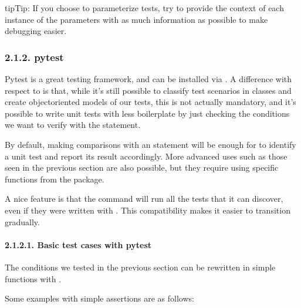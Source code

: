 \documentclass[a4paper,10pt,english]{sphinxmanual}
\begin{document}
\begin{sphinxadmonition}{tip}{Tip:}
If you choose to parameterize tests, try to provide the context of each
instance of the parameters with as much information as possible to make
debugging easier.
\end{sphinxadmonition}


\subsubsection{2.1.2. pytest}
\label{\detokenize{chapters/8_unit_testing/index:pytest}}
Pytest is a great testing framework, and can be installed via . A
difference with respect to  is that, while it’s still possible to classify test scenarios
in classes and create object\sphinxhyphen{}oriented models of our tests, this is not actually mandatory, and
it’s possible to write unit tests with less boilerplate by just checking the conditions we want
to verify with the  statement.

By default, making comparisons with an  statement will be enough for  to
identify a unit test and report its result accordingly. More advanced uses such as those seen
in the previous section are also possible, but they require using specific functions from the
package.

A nice feature is that the command  will run all the tests that it can discover, even
if they were written with . This compatibility makes it easier to transition gradually.


\paragraph{2.1.2.1. Basic test cases with pytest}
\label{\detokenize{chapters/8_unit_testing/index:basic-test-cases-with-pytest}}
The conditions we tested in the previous section can be rewritten in simple functions with
.

Some examples with simple assertions are as follows:
\end{document}
